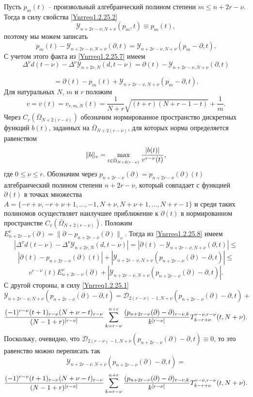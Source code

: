 Пусть $p_m(t)$ -- произвольный алгебраический полином степени $m\le n+2r-\nu$. Тогда в силу свойства \eqref{Ynrreq1.2.25.2}
$$
 \mathcal{Y}_{n+2r-\nu,N+\nu}(p_m,t)\equiv p_m(t),
$$
поэтому мы можем записать
$$
p_m(t)- \mathcal{Y}_{n+2r-\nu,N+\nu}(\partial,t)=\mathcal{Y}_{n+2r-\nu,N+\nu}(p_m-\partial,t).
$$
С учетом этого факта из \eqref{Ynrreq1.2.25.7}  имеем
$$
\Delta^\nu d(t-\nu)-\Delta^\nu\mathcal{Y}_{n+2r,N}(d,t-\nu)=\partial(t)-\mathcal{Y}_{n+2r-\nu,N+\nu}(\partial,t)
$$

\begin{equation}\label{Ynrreq1.2.25.8}
=\partial(t)- p_m(t)+\mathcal{Y}_{n+2r-\nu,N+\nu}(p_m-\partial,t).
\end{equation}
Для натуральных  $N$,  $m$  и $r$  положим
$$
v=v(t)=v_{r,m,N}(t)=\frac1{N+r}\sqrt{(t+r)(N+r-1-t)}+\frac1m.
$$
Через $C_v(\bar \Omega_{N+2(r-\nu)})$ обозначим нормированное пространство дискретных  функций $b(t)$, заданных на $\bar \Omega_{N+2(r-\nu)}$,  для которых норма определяется равенством
 $$
 \|b\|_v=\max_{t\in \bar\Omega_{N+2(r-\nu)}} {|b(t)|\over v^{r-\nu}(t)},
 $$
где $0\le \nu\le r$. Обозначим через $p_{n+2r-\nu}(\partial)=p_{n+2r-\nu}(\partial)(t)$ алгебраический полином степени $n+2r-\nu$, который совпадает с функцией  $\partial(t)$ в точках множества $A=\{-r+\nu,-r+\nu+1,\ldots,-1, N+\nu, N+\nu+1, \ldots, N+r-1\}$ и среди таких полиномов осуществляет наилучшее приближение к  $\partial(t)$ в нормированном  пространстве  $C_v(\bar \Omega_{N+2(r-\nu)})$. Положим $E_{n+2r-\nu}^v(\partial)=\|\partial- p_{n+2r-\nu}(\partial)\|_v$. Тогда
из \eqref{Ynrreq1.2.25.8} имеем
 $$
|\Delta^\nu d(t-\nu) -\Delta^\nu\mathcal{Y}_{n+2r,N}(d,t-\nu)|=|\partial(t)-\mathcal{Y}_{n+2r-\nu,N+\nu}(\partial,t)| \le
$$
$$
|\partial(t)-   p_{n+2r-\nu}(\partial)(t)|+|\mathcal{Y}_{n+2r-\nu,N+\nu}(p_{n+2r-\nu}(\partial)-\partial,t)|\le
$$
\begin{equation}\label{Ynrreq1.2.25.9}
v^{r-\nu}(t)E_{n+2r-\nu}^v(\partial)+|\mathcal{Y}_{n+2r-\nu,N+\nu}(p_{n+2r-\nu}(\partial)-\partial,t)|.
\end{equation}
С другой стороны, в силу \eqref{Ynrreq1.2.25.1}
$$
\mathcal{Y}_{n+2r-\nu,N+\nu}(p_{n+2r-\nu}(\partial)-\partial,t)=\mathcal{D}_{2(r-\nu)-1,N+\nu}(p_{n+2r-\nu}(\partial)-\partial,t)+
$$
$$
{(-1)^{r-\nu}(t+1)_{r-\nu}(N+\nu-t)_{r-\nu}\over (N-1+r)^{[r-\nu]}}
\sum_{k=r-\nu}^{n+r} {(p_{n+2r-\nu}(\partial)-\partial)_{r-\nu,k}\over k^{[r-\nu]}}
T_{k-r+\nu}^{r-\nu,r-\nu}(t,N+\nu).
$$
Поскольку, очевидно, что $\mathcal{D}_{2(r-\nu)-1,N+\nu}(p_{n+2r-\nu}(\partial)-\partial,t)\equiv 0$, то это равенство можно переписать так
$$
\mathcal{Y}_{n+2r-\nu,N+\nu}(p_{n+2r-\nu}(\partial)-\partial,t)=
$$
\begin{equation}\label{Ynrreq1.2.25.10}
{(-1)^{r-\nu}(t+1)_{r-\nu}(N+\nu-t)_{r-\nu}\over (N-1+r)^{[r-\nu]}}
\sum_{k=r-\nu}^{n+r} {(p_{n+2r-\nu}(\partial)-\partial)_{r-\nu,k}\over k^{[r-\nu]}}
T_{k-r+\nu}^{r-\nu,r-\nu}(t,N+\nu).
\end{equation}

